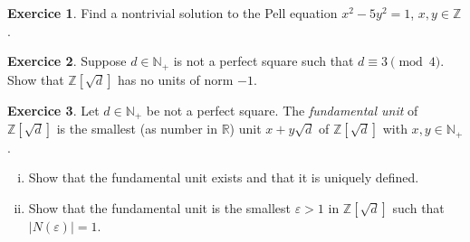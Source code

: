 \documentclass[12pt,a4paper]{article}
\theoremstyle{plain}
\newtheorem*{Sol*}{Solution}
\theoremstyle{definition}
\newtheorem{Ex}{Exercice}
\def \N {\mathbb N}
\def \Q {\mathbb Q}
\def \Z {\mathbb Z}
\newif\ifsolutions
\newcommand{\exercise}[2]{
			\begin{Ex} #1 \end{Ex}
			\ifsolutions  \begin{Sol*} #2 \end{Sol*} \bigskip \else \bigskip  \fi
		}
\begin{document}
\exercise{Find a nontrivial  solution to the Pell equation $x^2 - 5 y^2 =1$, $x,y ∈ ℤ$.}{}

\exercise{Suppose $d ∈ℕ_+$ is not a perfect square such that $d ≡ 3 \pmod{4}$. Show that $ℤ[\sqrt{d}]$ has no units of norm $-1$. }
{
	If an element $x+y\sqrt{d} \in \Z[\sqrt{d}]$ has norm $-1$, then one has
		\[ x^2 + y^2 \equiv 3 \pmod{4}. \]
	Since squares have residue 0 or 1 mod 4, this equation admits no solution.
}


\exercise{Let $d ∈ ℕ_+$ be not a perfect square. The \emph{fundamental unit} of $ℤ[\sqrt{d}]$ is the smallest (as number in $ℝ$) unit $x + y \sqrt{d}$ of $ℤ[\sqrt{d}]$ with $x,y ∈ℕ_+$.

\bigskip 

\noindent
\begin{enumerate}[i)]
\item 
  Show that the fundamental unit exists and that it is uniquely defined.
\item Show that the fundamental unit is the smallest $ε>1$ in $ℤ[\sqrt{d}]$ such that $|N(ε)| =  1$. 
\end{enumerate}
}{
	\begin{enumerate}[i)]
		\item
		By exercise 1 of set 3, there exist infinitely many solutions of the equation $N(\alpha) = k, \alpha \in \Z[\sqrt{d}]$ for some integer $k < 1 + 2\sqrt{d}$.
			As such, there must exist two elements $\alpha, \beta \in \Z[\sqrt{d}]$ with coordinates in the basis $\{1, \sqrt{d}\}$ congruent mod $k$.

		One then verifies that $\frac1k \alpha \bar{\beta} \in \Z[\sqrt{d}]$, which concludes, since
			\[  N\left(\frac1k \alpha \bar{\beta}\right) \in \Z[\sqrt{d}] = \frac1{k^2} N(u) N(v) = 1. \]

		The uniqueness is then given by the fact that 1 and $\sqrt{d}$ are linearly independent over $\Q$.
		\item
		We show that units of $\Z[\sqrt{d}]$ which belong in $\N_+[\sqrt{d}]$ are exactly the elements of $\Z[\sqrt{d}]$ greater than 1 and of unit norm.

		First, let $\alpha = x + y\sqrt{d}$ be a unit of $\Z[\sqrt{d}]$ with $x, y > 0$. Clearly, $\alpha > 1$.
		Furthermore, $N(\alpha) N(\alpha^{-1}) = N(1) = 1$, which means that $N(\alpha)$ is a unit of $\Z$, ie. $\pm1$.

		On the other hand, let $\epsilon = x + y\sqrt{d} \in \Z[\sqrt{d}]$ such that $\epsilon > 1$ and $|N(\alpha)|$ = 1.
		Then $N(\epsilon) = \epsilon \bar{\epsilon} = \pm1$, where $\bar{\epsilon} = x - y \sqrt{d} \in \Z[\sqrt{d}]$.
		Hence $\epsilon^{-1} = \pm \epsilon$, and $\epsilon$ is a unit.

		Finally, we show that the cases $(x \leq 0, y \leq 0)$, $(x \leq 0, y \geq 0)$, $(x \geq 0, y \leq 0)$ are impossible.
		The first case is clear.
		In the second case, since $\epsilon^{-1} = \pm \bar{\epsilon}$, then either $\bar{\epsilon} < 0$ or $-\bar{\epsilon} \geq \epsilon > 1$ allows us to find a contradiction.
		The third case is similar.

	\end{enumerate}
}
\end{document}
